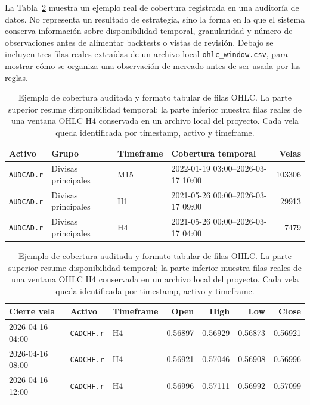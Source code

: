 La Tabla~\ref{tab:ejemplo-cobertura-datos} muestra un ejemplo real de cobertura
registrada en una auditor\'ia de datos. No representa un resultado de estrategia,
sino la forma en la que el sistema conserva informaci\'on sobre disponibilidad
temporal, granularidad y n\'umero de observaciones antes de alimentar backtests o
vistas de revisi\'on. Debajo se incluyen tres filas reales extra\'idas de un
archivo local \texttt{ohlc\_window.csv}, para mostrar c\'omo se organiza una
observaci\'on de mercado antes de ser usada por las reglas.

\begin{table}[H]
\centering
\scriptsize
\begin{tabular}{llllr}
\hline
\textbf{Activo} & \textbf{Grupo} & \textbf{Timeframe} & \textbf{Cobertura temporal} & \textbf{Velas} \\
\hline
\texttt{AUDCAD.r} & Divisas principales & M15 & 2022-01-19 03:00--2026-03-17 10:00 & 103306 \\
\texttt{AUDCAD.r} & Divisas principales & H1 & 2021-05-26 00:00--2026-03-17 09:00 & 29913 \\
\texttt{AUDCAD.r} & Divisas principales & H4 & 2021-05-26 00:00--2026-03-17 04:00 & 7479 \\
\hline
\end{tabular}

\vspace{0.7em}

\begin{tabular}{lllrrrr}
\hline
\textbf{Cierre vela} & \textbf{Activo} & \textbf{Timeframe} & \textbf{Open} & \textbf{High} & \textbf{Low} & \textbf{Close} \\
\hline
2026-04-16 04:00 & \texttt{CADCHF.r} & H4 & 0.56897 & 0.56929 & 0.56873 & 0.56921 \\
2026-04-16 08:00 & \texttt{CADCHF.r} & H4 & 0.56921 & 0.57046 & 0.56908 & 0.56996 \\
2026-04-16 12:00 & \texttt{CADCHF.r} & H4 & 0.56996 & 0.57111 & 0.56992 & 0.57099 \\
\hline
\end{tabular}
\caption[Ejemplo de cobertura y filas OHLC]{Ejemplo de cobertura auditada y formato tabular de filas OHLC.
La parte superior resume disponibilidad temporal; la parte inferior muestra
filas reales de una ventana OHLC H4 conservada en un archivo local del
proyecto. Cada vela queda identificada por timestamp, activo y timeframe.}
\label{tab:ejemplo-cobertura-datos}
\end{table}

